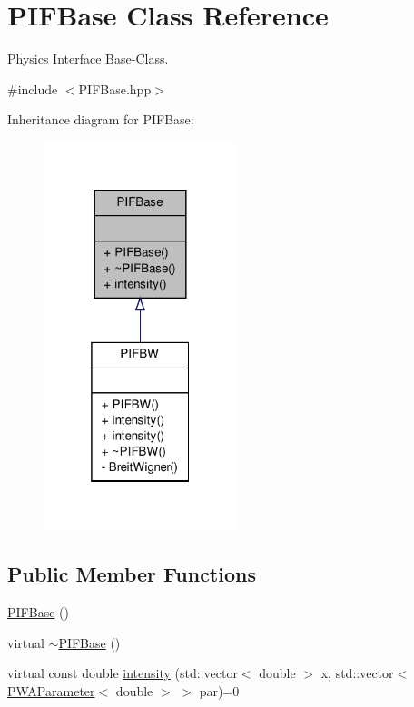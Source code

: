 \hypertarget{classPIFBase}{
\section{PIFBase Class Reference}
\label{d5/d3f/classPIFBase}
}


Physics Interface Base-\/Class.  




{\ttfamily \#include $<$PIFBase.hpp$>$}



Inheritance diagram for PIFBase:\nopagebreak
\begin{figure}[H]
\begin{center}
\leavevmode
\includegraphics[width=160pt]{d7/d2b/classPIFBase__inherit__graph}
\end{center}
\end{figure}
\subsection*{Public Member Functions}
\begin{DoxyCompactItemize}
\item 
\hyperlink{classPIFBase_aa435256425c756fa92b2008ca7381a47}{PIFBase} ()
\item 
virtual \hyperlink{classPIFBase_a0b598b33b36f0ecda10c9cafe3c8e083}{$\sim$PIFBase} ()
\item 
virtual const double \hyperlink{classPIFBase_a4def79f9856b29d19525dc0ac037da7b}{intensity} (std::vector$<$ double $>$ x, std::vector$<$ \hyperlink{classPWAParameter}{PWAParameter}$<$ double $>$ $>$ par)=0
\end{DoxyCompactItemize}


